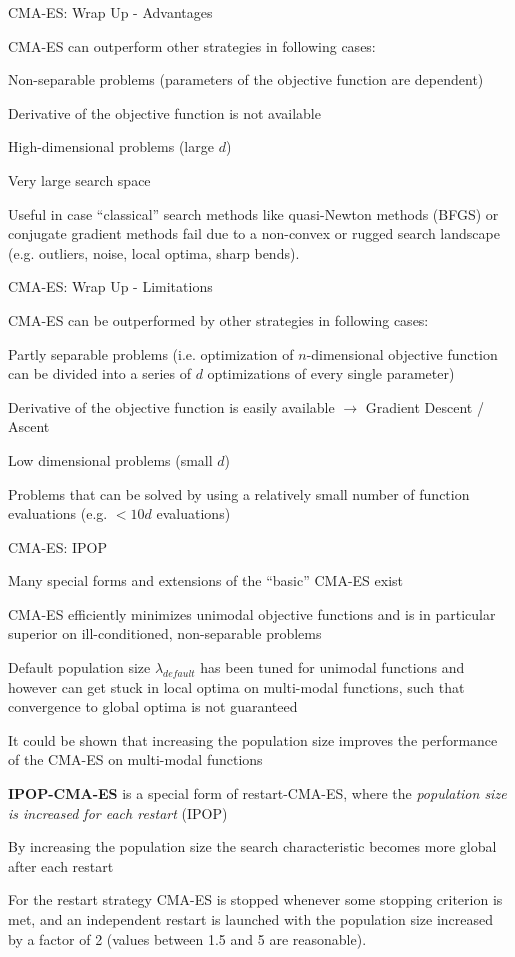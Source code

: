 \documentclass[11pt,compress,t,notes=noshow, xcolor=table]{beamer}
\begin{document}
\begin{framei}[sep=L]{CMA-ES: Wrap Up - Advantages}
\item CMA-ES can outperform other strategies in following cases:
\item Non-separable problems (parameters of the objective function are dependent)
\item Derivative of the objective function is not available
\item High-dimensional problems (large $d$)
\item Very large search space
\item Useful in case \enquote{classical} search methods like quasi-Newton methods (BFGS) or conjugate gradient methods fail due to a non-convex or rugged search landscape (e.g. outliers, noise, local optima, sharp bends).
\end{framei}


\begin{framei}[sep=L]{CMA-ES: Wrap Up - Limitations}
\item CMA-ES can be outperformed by other strategies in following cases:
\item Partly separable problems (i.e. optimization of $n$-dimensional objective function can be divided into a series of $d$ optimizations of every single parameter)
\item Derivative of the objective function is easily available $\rightarrow$ Gradient Descent / Ascent
\item Low dimensional problems (small $d$)
\item Problems that can be solved by using a relatively small number of function evaluations (e.g. $< 10 d$ evaluations)
\end{framei}


\begin{framei}[fs=footnotesize]{CMA-ES: IPOP}
\item Many special forms and extensions of the \enquote{basic} CMA-ES exist
\item CMA-ES efficiently minimizes unimodal objective functions and is in particular superior on ill-conditioned, non-separable problems
\item Default population size $\lambda_{default}$ has been tuned for unimodal
functions and however can get stuck in local optima on multi-modal functions, such that convergence to global optima is not guaranteed
\item It could be shown that increasing the population size improves the performance of the CMA-ES on multi-modal functions
\item \textbf{IPOP-CMA-ES} is a special form of restart-CMA-ES, where the \textit{population size is increased for each restart} (IPOP)
\item By increasing the population size the search characteristic becomes more global after each restart
\item For the restart strategy CMA-ES is stopped whenever some stopping criterion is met, and an independent restart is launched with the population size increased by a factor of 2 (values between 1.5 and 5 are reasonable).
\end{framei}
\end{document}
